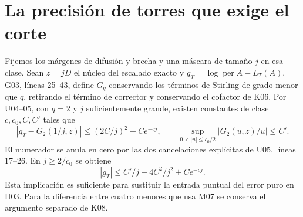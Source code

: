 \section{La precisión de torres que exige el corte}
Fijemos los márgenes de difusión y brecha y una máscara de tamaño $j$ en esa clase.
Sean $z=jD$ el núcleo del escalado exacto y $g_T=\log\operatorname{per}A-L_T(A)$.
G03, líneas 25--43, define $G_q$ conservando los términos de Stirling de grado
menor que $q$, retirando el término de corrector y conservando el cofactor de K06.
Por U04--05, con $q=2$ y $j$ suficientemente grande, existen constantes de clase
$c,c_0,C,C'$ tales que
\[
 |g_T-G_2(1/j,z)|\le (2C/j)^2+Ce^{-cj},\qquad
 \sup_{0<|u|\le c_0/2}|G_2(u,z)/u|\le C'.
\]
El numerador se anula en cero por las dos cancelaciones explícitas de U05, líneas 17--26.
En $j\ge2/c_0$ se obtiene
\[
 |g_T|\le C'/j+4C^2/j^2+Ce^{-cj}.
\]
Esta implicación es suficiente para sustituir la entrada puntual del error puro en H03.
Para la diferencia entre cuatro menores que usa M07 se conserva el argumento separado de K08.

